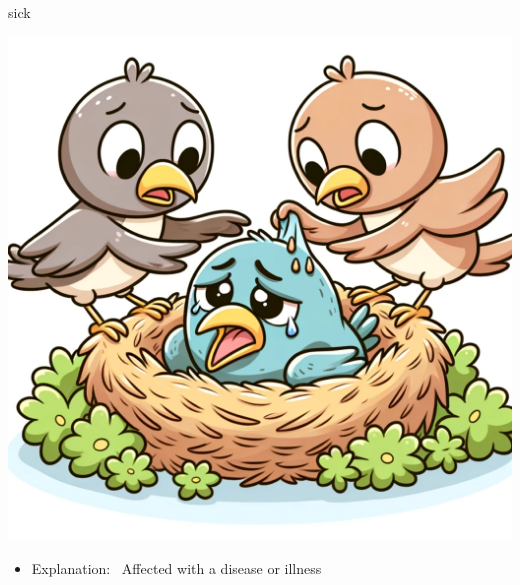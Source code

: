 \documentclass[avery5371, grid,frame]{flashcards}
\begin{document}
\renewcommand{\cardpaper}{a4paper}
\renewcommand{\cardpapermode}{landscape}
\renewcommand{\cardrows}{2}
\renewcommand{\cardcolumns}{2}
\setlength{\cardheight}{3.5in}
\setlength{\cardwidth}{5.0in}
\setlength{\topoffset}{0.65in}
\setlength{\oddoffset}{0.65in}
\setlength{\evenoffset}{0.65in}

\begin{flashcard}{sick}
    \vspace*{\fill}
    \begin{center}
        \begin{minipage}[c]{.45\textwidth}
            \includegraphics[width=\textwidth]{cards/s/sick/sick - a bird in a nest, looking weak and tired, with other birds bringing it food and care.png}
        \end{minipage}
        \begin{minipage}[c]{.45\textwidth}
            \begin{itemize}\setlength\itemsep{12pt}
            \item Explanation: \ Affected with a disease or illness


\end{itemize}
\end{minipage}
\end{center}
\end{flashcard}
\end{document}
